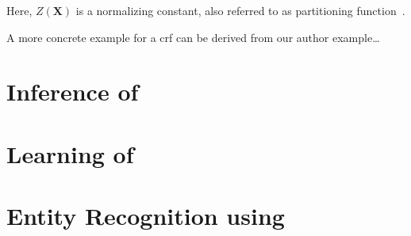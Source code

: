 Here, $Z(\bm{X})$ is a normalizing constant, also referred to as partitioning function~\citep{koller2009probabilistic}.

\bigskip

A more concrete example for a \gls{crf} can be derived from our author example\dots


\section{Inference of }\label{sec:inference-crfs}


\section{Learning of }\label{sec:learning-crfs}


\section{Entity Recognition using }\label{sec:er-using-crfs}

